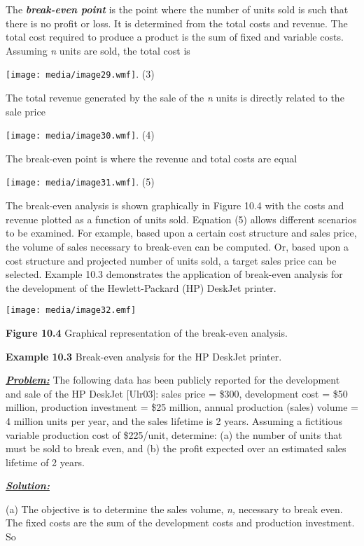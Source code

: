 The \emph{\textbf{break-even point}} is the point where the number of
units sold is such that there is no profit or loss. It is determined
from the total costs and revenue. The total cost required to produce a
product is the sum of fixed and variable costs. Assuming \emph{n} units
are sold, the total cost is

\texttt{[image: media/image29.wmf]}. (3)

The total revenue generated by the sale of the \emph{n} units is
directly related to the sale price

\texttt{[image: media/image30.wmf]}. (4)

The break-even point is where the revenue and total costs are equal

\texttt{[image: media/image31.wmf]}. (5)

The break-even analysis is shown graphically in Figure 10.4 with the
costs and revenue plotted as a function of units sold. Equation (5)
allows different scenarios to be examined. For example, based upon a
certain cost structure and sales price, the volume of sales necessary to
break-even can be computed. Or, based upon a cost structure and
projected number of units sold, a target sales price can be selected.
Example 10.3 demonstrates the application of break-even analysis for the
development of the Hewlett-Packard (HP) DeskJet printer.

\texttt{[image: media/image32.emf]}

\textbf{Figure 10.4} Graphical representation of the break-even
analysis.

\textbf{Example 10.3} Break-even analysis for the HP DeskJet printer.

\emph{\textbf{\ul{Problem:}}} The following data has been publicly
reported for the development and sale of the HP DeskJet {[}Ulr03{]}:
sales price = \$300, development cost = \$50 million, production
investment = \$25 million, annual production (sales) volume = 4 million
units per year, and the sales lifetime is 2 years. Assuming a fictitious
variable production cost of \$225/unit, determine: (a) the number of
units that must be sold to break even, and (b) the profit expected over
an estimated sales lifetime of 2 years.

\emph{\textbf{\ul{Solution:}}}

(a) The objective is to determine the sales volume, \emph{n,} necessary
to break even. The fixed costs are the sum of the development costs and
production investment. So

